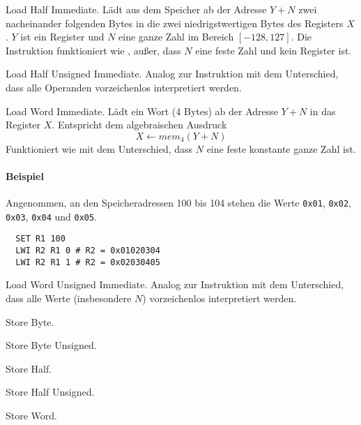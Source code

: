 \glqq Load Half Immediate\grqq.
Lädt aus dem Speicher ab der Adresse $Y + N$ zwei nacheinander folgenden Bytes
in die zwei niedrigstwertigen Bytes des Registers $X$.
$Y$ ist ein Register und $N$ eine ganze Zahl im Bereich $[-128, 127]$.
Die Instruktion funktioniert wie , außer, dass $N$ eine feste Zahl und
kein Register ist.


\glqq Load Half Unsigned Immediate\grqq.
Analog zur Instruktion  mit dem Unterschied, dass alle Operanden
vorzeichenlos interpretiert werden.


\glqq Load Word Immediate\grqq.
Lädt ein Wort (4 Bytes) ab der Adresse $Y + N$ in das Register $X$. Entspricht
dem algebraischen Ausdruck
\[
    X \gets mem_{4}(Y + N)
\]
Funktioniert wie  mit dem Unterschied, dass $N$ eine feste konstante
ganze Zahl ist.

\paragraph{Beispiel}
Angenommen, an den Speicheradressen 100 bis 104 stehen die Werte \texttt{0x01},
\texttt{0x02}, \texttt{0x03}, \texttt{0x04} und \texttt{0x05}.
\begin{lstlisting}
  SET R1 100
  LWI R2 R1 0 # R2 = 0x01020304
  LWI R2 R1 1 # R2 = 0x02030405
\end{lstlisting}


\glqq Load Word Unsigned Immediate\grqq.
Analog zur Instruktion  mit dem Unterschied, dass alle Werte
(insbesondere $N$) vorzeichenlos interpretiert werden.



\glqq Store Byte\grqq.



\glqq Store Byte Unsigned\grqq.



\glqq Store Half\grqq.



\glqq Store Half Unsigned\grqq.



\glqq Store Word\grqq.

